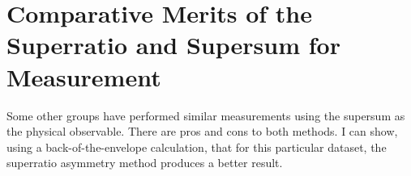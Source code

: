 \section{Comparative Merits of the Superratio and Supersum for Measurement}
Some other groups have performed similar measurements using the supersum as the physical observable.  There are pros and cons to both methods.  I can show, using a back-of-the-envelope calculation, that for this particular dataset, the superratio asymmetry method produces a better result.  

